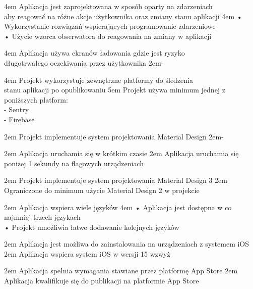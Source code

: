 {4em}{
    Aplikacja jest zaprojektowana w sposób oparty na zdarzeniach\\
    aby reagować na różne akcje użytkownika oraz zmiany stanu aplikacji
}
{4em}{
    • Wykorzystanie rozwiązań wspierających programowanie zdarzeniowe\\
    • Użycie wzorca obserwatora do reagowania na zmiany w aplikacji
}

{4em}{
    Aplikacja używa ekranów ładowania gdzie jest ryzyko\\
    długotrwałego oczekiwania przez użytkownika
}
{2em}{-}

{4em}{
    Projekt wykorzystuje zewnętrzne platformy do śledzenia\\
    stanu aplikacji po opublikowaniu
}
{5em}{
    Projekt używa minimum jednej z poniższych platform:\\
    - Sentry\\
    - Firebase
}

{2em}{
    Projekt implementuje system projektowania Material Design
}
{2em}{-}

{2em}{
    Aplikacja uruchamia się w krótkim czasie
}
{2em}{
    Aplikacja uruchamia się poniżej 1 sekundy na flagowych urządzeniach
}

{2em}{
    Projekt implementuje system projektowania Material Design 3
}
{2em}{
    Ograniczone do minimum użycie Material Design 2 w projekcie
}

{2em}{
    Aplikacja wspiera wiele języków
}
{4em}{
    • Aplikacja jest dostępna w co najmniej trzech językach\\
    • Projekt umożliwia łatwe dodawanie kolejnych języków
}

{2em}{
    Aplikacja jest możliwa do zainstalowania na urządzeniach z systemem iOS
}
{2em}{
    Aplikacja wspiera system iOS w wersji 15 wzwyż
}

{2em}{
    Aplikacja spełnia wymagania stawiane przez platformę App Store
}
{2em}{
    Aplikacja kwalifikuje się do publikacji na platformie App Store
}

